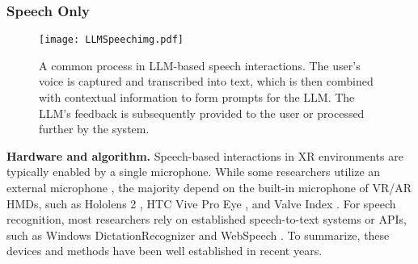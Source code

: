 \documentclass[review]{fcs}
\newcommand{\revise}[2]{\textcolor[rgb]{0,0,0}{#2}}
\begin{document}
\subsubsection{Speech Only} 
\label{SpeechOnly}

\begin{figure}[t]
    \begin{center}
    \texttt{[image: LLMSpeechimg.pdf]}
    \end{center}
    \caption{
        \revise{}{A common process in LLM-based speech interactions. The user's voice is captured and transcribed into text, which is then combined with contextual information to form prompts for the LLM. The LLM's feedback is subsequently provided to the user or processed further by the system.}
    }
    \label{fig:LLMSpeech}
\end{figure}


\textbf{Hardware and algorithm.} Speech-based interactions in XR environments are typically enabled by a single microphone. While some researchers utilize an external microphone \cite{DBLP:conf/vr/SaintAubertAMPAL23, DBLP:conf/chi/Hedeshy0MS21}, the majority depend on the built-in microphone of VR/AR HMDs, such as Hololens 2 \cite{DBLP:conf/ismar/ChenGFCL23}, HTC Vive Pro Eye \cite{DBLP:conf/vr/JingLB22, DBLP:conf/ismar/MengXL22}, and Valve Index \cite{DBLP:conf/vr/HombeckVHDL23}. For speech recognition, most researchers rely on established speech-to-text systems or APIs, such as Windows DictationRecognizer \cite{DBLP:conf/vr/JingLB22} and WebSpeech \cite{DBLP:conf/uist/LiaoKJKS22}. To summarize, these devices and methods have been well established in recent years.
\end{document}
